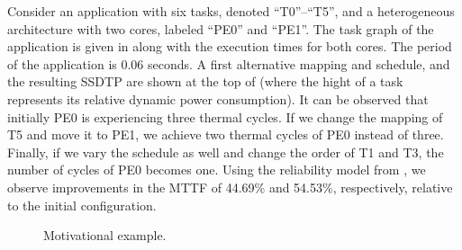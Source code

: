 Consider an application with six tasks, denoted ``T0''--``T5'', and a heterogeneous architecture with two cores, labeled ``PE0'' and ``PE1''. The task graph of the application is given in  along with the execution times for both cores. The period of the application is 0.06 seconds. A first alternative mapping and schedule, and the resulting SSDTP are shown at the top of  (where the hight of a task represents its relative dynamic power consumption). It can be observed that initially PE0 is experiencing three thermal cycles. If we change the mapping of T5 and move it to PE1, we achieve two thermal cycles of PE0 instead of three. Finally, if we vary the schedule as well and change the order of T1 and T3, the number of cycles of PE0 becomes one. Using the reliability model from , we observe improvements in the MTTF of 44.69\% and 54.53\%, respectively, relative to the initial configuration.
\begin{figure}
  \centering
  \vspace{-10pt}

  \caption{Motivational example.}
  \vspace{10pt}
\end{figure}
